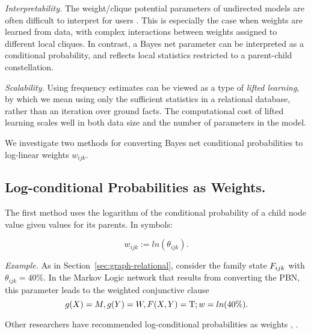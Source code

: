 \documentclass[twoside,leqno,twocolumn]{article}
\begin{document}
\emph{Interpretability.} The weight/clique potential parameters of undirected models are often difficult to interpret for users \cite{Pearl1988}. 
This is especially the case when weights are learned from data, with complex interactions between weights assigned to different local cliques. In contrast, a Bayes net parameter can be interpreted as a conditional probability, and reflects local statistics restricted to a parent-child constellation.

\emph{Scalability.} 
Using frequency estimates can be viewed as a type of {\em lifted learning}, by which we mean using only the sufficient statistics in a relational database, rather than an iteration over ground facts. The computational cost of lifted learning scales well in both data size and the number of parameters in the model. 

We investigate two methods for converting Bayes net conditional probabilities to log-linear weights $w_{ijk}$. 

\subsection{Log-conditional Probabilities as Weights.} \label{sec:logprob} The first method uses the logarithm of the conditional probability of a child node value given values for its parents. In symbols:

\begin{equation*}
w_{ijk} := ln(\theta_{ijk}).
\end{equation*}

{\em Example.} As in Section~\ref{sec:graph-relational}, consider the family state 
$F_{ijk}$ with $\theta_{ijk} = 40\%$. In the Markov Logic network that results from converting the PBN, this parameter leads to the weighted conjunctive clause 
\[g(X)= M, g(Y) = W, F(X,Y) = \mathrm{T}; w = ln(40\%).\]%

Other researchers have recommended log-conditional probabilities as weights   \cite{Domingos2007}, \cite{bib:bayes-convert}. 
\end{document}
